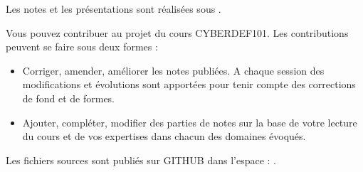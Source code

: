 


Les notes et les présentations sont réalisées sous . 

Vous pouvez contribuer au projet du cours CYBERDEF101. Les contributions peuvent se faire sous deux formes :

\begin{itemize}
  \item Corriger, amender, améliorer les notes publiées. A chaque session des modifications et évolutions sont apportées pour tenir compte des corrections de fond et de formes. 
  \item Ajouter, compléter, modifier des parties de notes sur la base de votre lecture du cours et de vos expertises dans chacun des domaines évoqués.
\end{itemize}

 Les fichiers sources sont publiés sur GITHUB dans l'espace : .
 